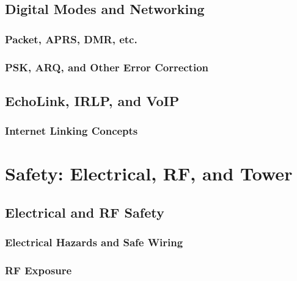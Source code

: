 \documentclass[12pt]{book}
\begin{document}
\chapter{Digital Modes and Networking}
\section{Packet, APRS, DMR, etc.}





\section{PSK, ARQ, and Other Error Correction}


\chapter{EchoLink, IRLP, and VoIP}
\section{Internet Linking Concepts}



\part{Safety: Electrical, RF, and Tower}
\chapter{Electrical and RF Safety}
\section{Electrical Hazards and Safe Wiring}



\section{RF Exposure}

\end{document}
